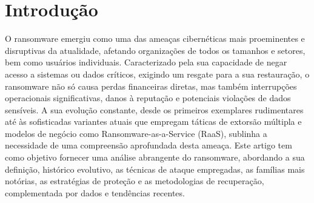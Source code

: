 
\section*{Introdução}

O ransomware emergiu como uma das ameaças cibernéticas mais proeminentes e disruptivas da atualidade, afetando organizações de todos os tamanhos 
e setores, bem como usuários individuais. Caracterizado pela sua capacidade de negar acesso a sistemas ou dados críticos, exigindo um resgate para a sua 
restauração, o ransomware não só causa perdas financeiras diretas, mas também interrupções operacionais significativas, danos à reputação e potenciais 
violações de dados sensíveis. A sua evolução constante, desde os primeiros exemplares rudimentares até às sofisticadas variantes atuais que empregam 
táticas de extorsão múltipla e modelos de negócio como Ransomware-as-a-Service (RaaS), sublinha a necessidade de uma compreensão aprofundada desta ameaça. 
Este artigo tem como objetivo fornecer uma análise abrangente do ransomware, abordando a sua definição, histórico evolutivo, as técnicas de ataque empregadas, 
as famílias mais notórias, as estratégias de proteção e as metodologias de recuperação, complementada por dados e tendências recentes.





